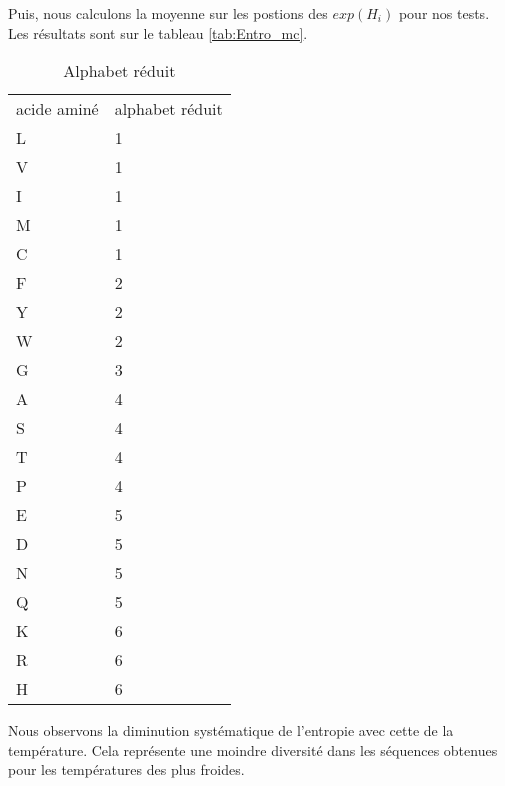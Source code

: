 Puis, nous calculons la moyenne sur les postions des $exp(H_i)$ pour nos tests. Les résultats sont sur le tableau \ref{tab:Entro_mc}.


    \begin{table}[!htbp]
      \centering
      
      \begin{tabular}{ll}
        \toprule
        acide aminé & alphabet réduit \\
        \cmidrule{1-2}     
        L & 1 \\
        V & 1 \\
        I & 1 \\
        M & 1 \\
        C & 1 \\
        F & 2 \\
        Y & 2 \\
        W & 2 \\
        G & 3 \\
        A & 4 \\
        S & 4 \\
        T & 4 \\
        P & 4 \\
        E & 5 \\
        D & 5 \\
        N & 5 \\
        Q & 5 \\
        K & 6 \\
        R & 6 \\
        H & 6 \\
        \bottomrule                
      \end{tabular}
      \caption{Alphabet réduit}      
      \label{tab:Alphabet}

    \end{table}

Nous observons la diminution systématique de l'entropie avec cette de la température. Cela représente une moindre diversité dans les séquences obtenues pour les températures des plus froides.

